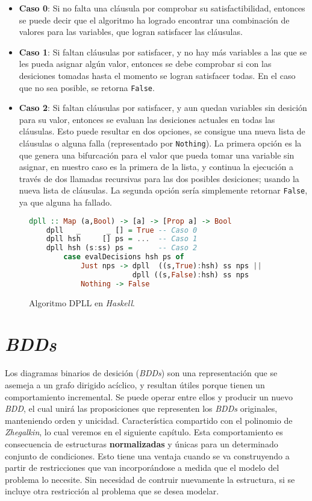 \begin{itemize}
    \item \textbf{Caso 0}: Si no falta una cláusula por comprobar su satisfactibilidad, entonces se puede decir que el algoritmo ha logrado encontrar una combinación de valores para las variables, que logran satisfacer las cláusulas.
    \item \textbf{Caso 1}: Si faltan cláusulas por satisfacer, y no hay más variables a las que se les pueda asignar algún valor, entonces se debe comprobar si con las desiciones tomadas hasta el momento se logran satisfacer todas. En el caso que no sea posible, se retorna \texttt{False}.
    \item \textbf{Caso 2}: Si faltan cláusulas por satisfacer, y aun quedan variables sin desición para su valor, entonces se evaluan las desiciones actuales en todas las cláusulas. Esto puede resultar en dos opciones, se consigue una nueva lista de cláusulas o alguna falla (representado por \texttt{Nothing}). La primera opción es la que genera una bifurcación para el valor que pueda tomar una variable sin asignar, en nuestro caso es la primera de la lista, y continua la ejecución a través de dos llamadas recursivas para las dos posibles desiciones; usando la nueva lista de cláusulas. La segunda opción sería simplemente retornar \texttt{False}, ya que alguna ha fallado.
\end{itemize}

\begin{figure}
\begin{lstlisting}[language=Haskell]
    dpll :: Map (a,Bool) -> [a] -> [Prop a] -> Bool
    dpll   _      _ [] = True -- Caso 0
    dpll hsh     [] ps = ...  -- Caso 1
    dpll hsh (s:ss) ps =      -- Caso 2
        case evalDecisions hsh ps of
            Just nps -> dpll  ((s,True):hsh) ss nps ||
                        dpll ((s,False):hsh) ss nps
            Nothing -> False
\end{lstlisting}
\caption{Algoritmo DPLL en \textit{Haskell}.}
\label{code:dpll}
\end{figure}

\section{\textit{BDDs}}
\label{sec:bdds}

Los diagramas binarios de desición (\textit{BDDs}) son una representación que se asemeja a un grafo dirigido acíclico, y resultan útiles porque tienen un comportamiento incremental. Se puede operar entre ellos y producir un nuevo \textit{BDD}, el cual unirá las proposiciones que representen los \textit{BDDs} originales, manteniendo orden y unicidad. Característica compartido con el polinomio de \textit{Zhegalkin}, lo cual veremos en el siguiente capítulo. Esta comportamiento es consecuencia de estructuras \textbf{normalizadas} y únicas para un determinado conjunto de condiciones. Esto tiene una ventaja cuando se va construyendo a partir de restricciones que van incorporándose a medida que el modelo del problema lo necesite. Sin necesidad de contruir nuevamente la estructura, si se incluye otra restricción al problema que se desea modelar.

